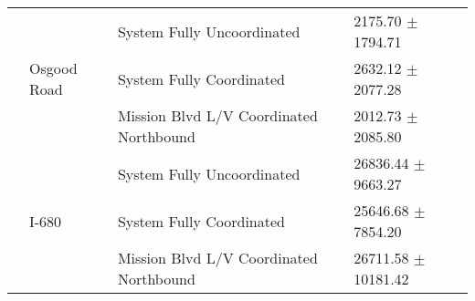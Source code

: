 \begin{tabular}{llll}
 & \multirow[t]{3}{*}{Osgood Road} & System Fully Uncoordinated & 2175.70 $\pm$ 1794.71 \\
 &  & System Fully Coordinated & 2632.12 $\pm$ 2077.28 \\
 &  & Mission Blvd L/V Coordinated Northbound & 2012.73 $\pm$ 2085.80 \\
 & \multirow[t]{3}{*}{I-680} & System Fully Uncoordinated & 26836.44 $\pm$ 9663.27 \\
 &  & System Fully Coordinated & 25646.68 $\pm$ 7854.20 \\
 &  & Mission Blvd L/V Coordinated Northbound & 26711.58 $\pm$ 10181.42 \\
\bottomrule
\end{tabular}
